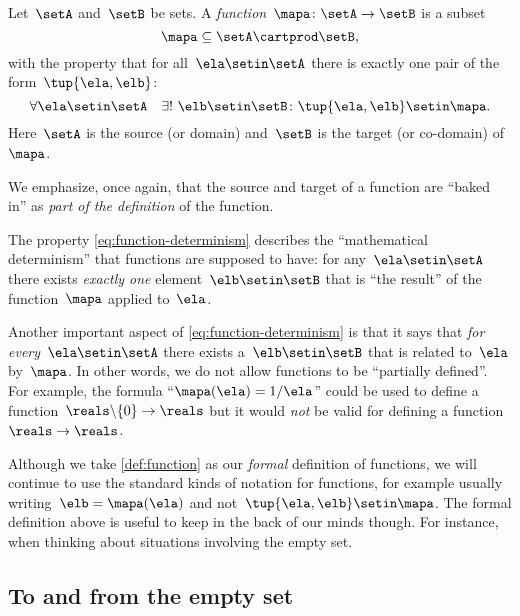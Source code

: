 \begin{ctdefinition}[Function]
    \label{def:function}
    Let~$\setA$ and~$\setB$ be sets.
    A \emph{function}~$\mapa\colon \setA \to \setB$ is a subset
    \begin{equation*}
        \mapa \subseteq \setA \cartprod \setB,
    \end{equation*}
    with the property that for all~$\ela \setin\setA$ there is exactly one pair of the form~$\tup{\ela,\elb}$:
    \begin{equation}
        \label{eq:function-determinism}
        \forall \ela \setin\setA  \quad  \exists !
        \ \elb \setin\setB \colon \tup{\ela,\elb} \setin\mapa.
    \end{equation}
    Here~$\setA$ is the source (or domain) and~$\setB$ is the target (or co-domain) of~$\mapa$.
\end{ctdefinition}

We emphasize, once again, that the source and target of a function are ``baked in'' as \emph{part of the definition} of the function.

The property \cref{eq:function-determinism} describes the ``mathematical determinism'' that functions are supposed to have: for any~$\ela \setin\setA$ there exists \emph{exactly one} element~$\elb \setin\setB$ that is ``the result'' of the function~$\mapa$ applied to~$\ela$.

Another important aspect of \cref{eq:function-determinism} is that it says that \emph{for every}~$\ela \setin\setA$ there exists a~$\elb \setin\setB$ that is related to~$\ela$ by~$\mapa$.
In other words, we do not allow functions to be ``partially defined''.
For example, the formula ``$\mapa(\ela) = 1/ \ela$'' could be used to define a function~$\reals \backslash \{ 0 \} \to \reals$ but it would \emph{not} be valid for defining a function~$\reals \to \reals$.

Although we take \cref{def:function} as our \emph{formal} definition of functions, we will continue to use the standard kinds of notation for functions, for example usually writing~$\elb = \mapa(\ela)$ and not~$\tup{\ela, \elb} \setin\mapa$.
The formal definition above is useful to keep in the back of our minds though.
For instance, when thinking about situations involving the empty set.

\subsection{To and from the empty set}

